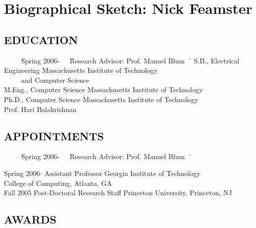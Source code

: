 \documentclass[11pt]{article}
\begin{document}
\section*{Biographical Sketch: Nick Feamster}



\subsection*{EDUCATION}

\begin{tabbing}
\ \ \ \ \ \=Spring 2006-\ \ \ \=Research Advisor: Prof. Manuel Blum\ \ \=   \kill
{}\> S.B., Electrical Engineering \> Massachusetts Institute of
Technology\\ \>\> \ \ \ \ \ and Computer Science \> \\

\> M.Eng., Computer Science \> Massachusetts Institute of Technology\\
\> Ph.D., Computer Science \> Massachusetts Institute of Technology\\
\>  Prof. Hari Balakrishnan \\
\end{tabbing}

\subsection*{APPOINTMENTS}

\begin{tabbing}
\ \ \ \ \ \=Spring 2006-\ \ \ \=Research Advisor: Prof. Manuel Blum\ \ \=   \kill

\> Spring 2006-\> Assistant Professor \> Georgia Institute of Technology \\
\> \> \> College of Computing, Atlanta, GA  \\
\> Fall 2005\> Post-Doctoral Research Staff \> Princeton University,
Princeton, NJ \\
\end{tabbing}

\subsection*{AWARDS}
\end{document}
